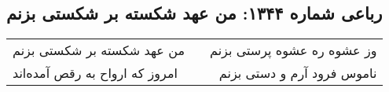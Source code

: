 \begin{center}
\section*{رباعی شماره ۱۳۴۴: من عهد شکسته بر شکستی بزنم}
\label{sec:1344}
\begin{longtable}{l p{0.5cm} r}
من عهد شکسته بر شکستی بزنم
&&
وز عشوه ره عشوه پرستی بزنم
\\
امروز که ارواح به رقص آمده‌اند
&&
ناموس فرود آرم و دستی بزنم
\\
\end{longtable}
\end{center}
